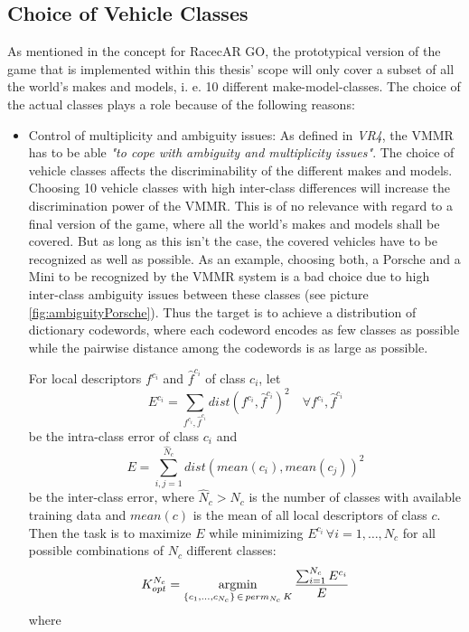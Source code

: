 \subsection{Choice of Vehicle Classes}\label{sec:choiceOfVehicleClasses}
As mentioned in the concept for RacecAR GO, the prototypical version of the game that is implemented within this thesis' scope will only cover a subset of all the world's makes and models, i. e. 10 different make-model-classes. The choice of the actual classes plays a role because of the following reasons:
\begin{itemize}
  \item Control of multiplicity and ambiguity issues: As defined in \emph{VR4}, the VMMR has to be able \emph{"to cope with ambiguity and multiplicity issues"}. The choice of vehicle classes affects the discriminability of the different makes and models. Choosing 10 vehicle classes with high inter-class differences will increase the discrimination power of the VMMR. This is of no relevance with regard to a final version of the game, where all the world's makes and models shall be covered. But as long as this isn't the case, the covered vehicles have to be recognized as well as possible. As an example, choosing both, a Porsche and a Mini to be recognized by the VMMR system is a bad choice due to high inter-class ambiguity issues between these classes (see picture \ref{fig:ambiguityPorsche}). Thus the target is to achieve a distribution of dictionary codewords, where each codeword encodes as few classes as possible while the pairwise distance among the codewords is as large as possible.
  
  For local descriptors $f^{c_i}$ and $\hat f^{c_i}$ of class $c_i$, let
  \begin{equation}
  E^{c_i} = \sum_{f^{c_i}, \hat f^{c_i}} dist(f^{c_i},\hat f^{c_i})^2 \quad \forall f^{c_i}, \hat f^{c_i}
  \end{equation}
  be the intra-class error of class $c_i$ and
  \begin{equation}
  E = \sum_{i, j = 1}^{\hat N_c} dist(mean(c_i), mean(c_j))^2
  \end{equation}
  be the inter-class error, where $\hat N_c > N_c$ is the number of classes with available training data and $mean(c)$ is the mean of all local descriptors of class $c$. Then the task is to maximize $E$ while minimizing $E^{c_i} \, \forall i = 1,\dots,N_c$ for all possible combinations of $N_c$ different classes:
  \begin{equation}\label{eq:optClasses}
  K_{opt}^{N_c} = \operatorname*{argmin}_{\{c_1,\dots,c_{N_c}\} \,\in\, perm_{N_c} \, K} \frac{\sum_{i = 1}^{N_c}E^{c_i}}{E}
  \end{equation}
  where
  

\end{itemize}
